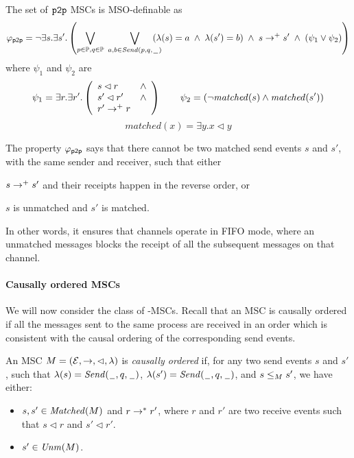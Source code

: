 The set of $\mathtt{p2p}$ MSCs is MSO-definable as
	\[
		\varphi_{\mathsf{p2p}} = \neg \exists s.\exists s'. \left(
		\bigvee_{\substack{p \in \mathbb{P}, q \in \mathbb{P}}}\;
		\bigvee_{\substack{a,b \in {\mathit{Send}(p,q,\hspace{0.1em}\underline{\hspace{0.5em}}\hspace{0.1em})}}}\hspace{-1em}
		(\lambda(s) = a \;\wedge\; \lambda(s') = b) \;\wedge\; s \to^+ s' \;\wedge\;
		(\psi_1 \vee \psi_2 ) 	
		\right)
	\]
	where $\psi_1$ and $\psi_2$ are
	\[
		\psi_1 = \exists r.\exists r'.\left(
		\begin{array}{ll}
			s \lhd r & \wedge\\
			s' \lhd r' & \wedge\\
			r' \to^+ r &
		\end{array} 
		\right) \quad \quad
		\psi_2 = (\neg \mathit{matched}(s) \wedge \mathit{matched}(s'))
		\]
		\[
		matched(x) = \exists y. x \lhd y
	\]

The property $\varphi_{\mathsf{p2p}}$ says that there cannot be two matched send events $s$ and $s'$, with the same sender and receiver, such that either
\begin{enumerate*}[label={(\roman*)}]
	\item $s \to^+ s'$ and their receipts happen in the reverse order, or
	\item $s$ is unmatched and $s'$ is matched.
\end{enumerate*}
In other words, it ensures that channels operate in FIFO mode, where an unmatched messages blocks the receipt of all the subsequent messages on that channel.


\paragraph{\bf Causally ordered MSCs}
We will now consider the class of \co-MSCs. Recall that an MSC is causally ordered if all the messages sent to the same process are received in an order which is consistent with the causal ordering of the corresponding send events. 

\begin{definition}[\co-MSC]
An MSC $M = (\mathcal{E},\to,\lhd,\lambda)$ is \emph{causally ordered} if, for any two send events $s$ and $s'$, such that $\lambda(s)={\mathit{Send}(\hspace{0.1em}\underline{\hspace{0.5em}}\hspace{0.1em},q,\hspace{0.1em}\underline{\hspace{0.5em}}\hspace{0.1em})}$, $\lambda(s')={\mathit{Send}(\hspace{0.1em}\underline{\hspace{0.5em}}\hspace{0.1em},q,\hspace{0.1em}\underline{\hspace{0.5em}}\hspace{0.1em})}$, and $s \le_M s'$, we have either:
\begin{itemize}%
	\item $s,s' \in \mathit{Matched}(M)$ and $r \to^* r'$, where $r$ and $r'$ are two receive events such that $s \lhd r$ and $s' \lhd r'$.
	\item $s' \in \mathit{Unm}(M)$.
\end{itemize}
\end{definition}

